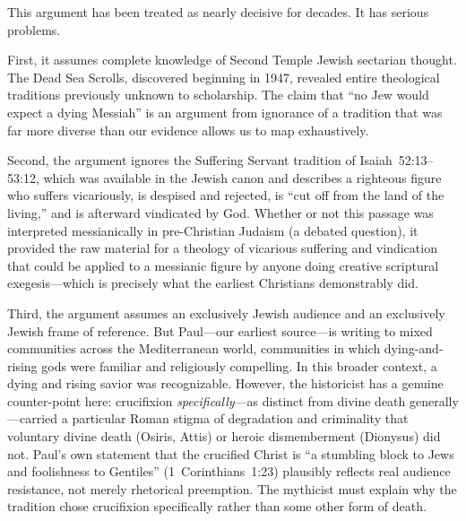 \documentclass[12pt,oneside]{article}
\begin{document}
This argument has been treated as nearly decisive for decades.  It has
serious problems.

First, it assumes complete knowledge of Second Temple Jewish sectarian
thought.  The Dead Sea Scrolls, discovered beginning in 1947, revealed
entire theological traditions previously unknown to scholarship.  The
claim that ``no Jew would expect a dying Messiah'' is an argument from
ignorance of a tradition that was far more diverse than our evidence
allows us to map exhaustively.

Second, the argument ignores the Suffering Servant tradition of
Isaiah~52:13--53:12, which was available in the Jewish canon and
describes a righteous figure who suffers vicariously, is despised and
rejected, is ``cut off from the land of the living,'' and is afterward
vindicated by God.  Whether or not this passage was interpreted
messianically in pre-Christian Judaism (a debated question), it
provided the raw material for a theology of vicarious suffering and
vindication that could be applied to a messianic figure by anyone doing
creative scriptural exegesis---which is precisely what the earliest
Christians demonstrably did.

Third, the argument assumes an exclusively Jewish audience and an
exclusively Jewish frame of reference.  But Paul---our earliest
source---is writing to mixed communities across the Mediterranean world,
communities in which dying-and-rising gods were familiar and religiously
compelling.  In this broader context, a dying and rising savior was
recognizable.  However, the historicist has a genuine counter-point
here: crucifixion \textit{specifically}---as distinct from divine death
generally---carried a particular Roman stigma of degradation and
criminality that voluntary divine death (Osiris, Attis) or heroic
dismemberment (Dionysus) did not.  Paul's own statement that the
crucified Christ is ``a stumbling block to Jews and foolishness to
Gentiles'' (1~Corinthians~1:23) plausibly reflects real audience
resistance, not merely rhetorical preemption.  The mythicist must
explain why the tradition chose crucifixion specifically rather than
some other form of death.
\end{document}
